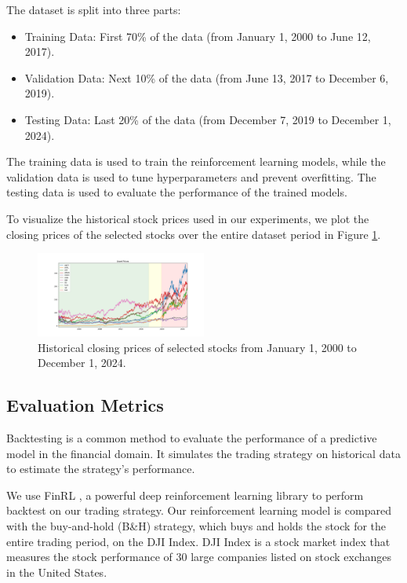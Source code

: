 \documentclass[conference]{IEEEtran}
\begin{document}
The dataset is split into three parts:
\begin{itemize}
  \item Training Data: First 70\% of the data (from January 1, 2000 to June 12, 2017).
  \item Validation Data: Next 10\% of the data (from June 13, 2017 to December 6, 2019).
  \item Testing Data: Last 20\% of the data (from December 7, 2019 to December 1, 2024).
\end{itemize}

The training data is used to train the reinforcement learning models, while the validation data is used to tune hyperparameters and prevent overfitting. The testing data is used to evaluate the performance of the trained models.

To visualize the historical stock prices used in our experiments, we plot the closing prices of the selected stocks over the entire dataset period in Figure \ref{fig:price_history}.

\begin{figure}[htbp]
  \centerline{\includegraphics[width=0.5\textwidth]{figs/prices.png}}
  \caption{Historical closing prices of selected stocks from January 1, 2000 to December 1, 2024.}
  \label{fig:price_history}
\end{figure}

\subsection{Evaluation Metrics}

Backtesting is a common method to evaluate the performance of a predictive model in the financial domain. It simulates the trading strategy on historical data to estimate the strategy's performance.

We use FinRL \cite{liu2022finrl}, a powerful deep reinforcement learning library to perform backtest on our trading strategy. Our reinforcement learning model is compared with the buy-and-hold (B\&H) strategy, which buys and holds the stock for the entire trading period, on the DJI Index. DJI Index is a stock market index that measures the stock performance of 30 large companies listed on stock exchanges in the United States.
\end{document}
